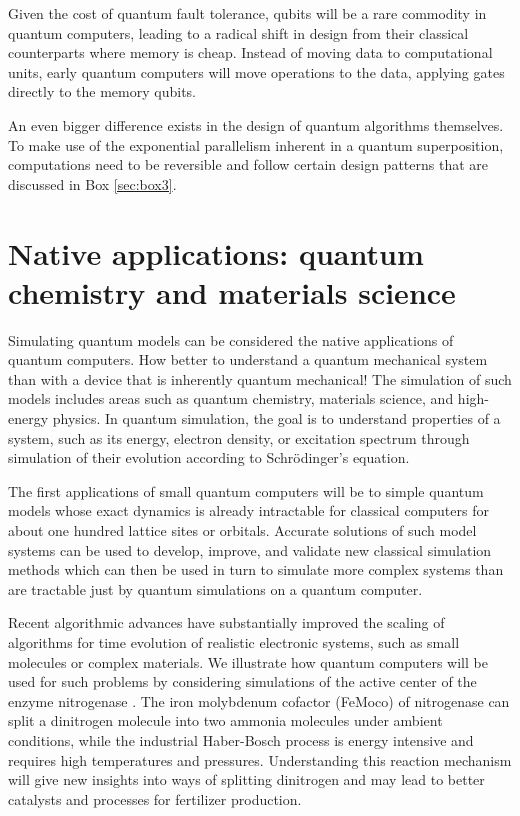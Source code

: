 \documentclass[journal]{IEEEtran}
\begin{document}
Given the cost of quantum fault tolerance, qubits will be a rare commodity in quantum computers, leading to a radical shift in design from their classical counterparts where memory is cheap. Instead of moving data to computational units, early quantum computers will move operations to the data, applying gates directly to the memory qubits.

 An even bigger difference exists in the design of quantum algorithms themselves. To make use of the  exponential parallelism inherent in a quantum superposition, computations need to be reversible and follow certain design patterns that are discussed in Box \ref{sec:box3}. 





\section{Native applications: quantum chemistry and materials science}

Simulating quantum models can be considered the native applications of quantum computers. How better to understand a quantum mechanical system than with a device that is inherently quantum mechanical! The simulation of such models includes areas such as quantum chemistry, materials science, and high-energy physics. In quantum simulation, the goal is to understand properties of a system, such as its energy, electron density, or excitation spectrum through simulation of their evolution according to Schr\"odinger's equation.  

The first applications of small quantum computers will be to simple quantum models whose exact dynamics is already intractable for classical computers for about one hundred lattice sites or orbitals.  Accurate solutions of such model systems can be used to develop, improve, and validate new classical simulation methods which can then be used in turn to simulate more complex systems than are tractable just by quantum simulations on a quantum computer. 

Recent algorithmic advances have substantially improved the scaling of algorithms for time evolution of realistic electronic systems, such as small molecules or complex materials. We illustrate how quantum computers will be used for such problems by considering simulations of the active center of the enzyme nitrogenase \cite{nitrogenasepaper}. The iron molybdenum cofactor (FeMoco) of nitrogenase can split a dinitrogen molecule into two ammonia molecules under ambient conditions, while the industrial Haber-Bosch process  is energy intensive and requires high temperatures and pressures. Understanding this reaction mechanism will give new insights into ways of splitting dinitrogen and may lead to better catalysts and processes for fertilizer production.
\end{document}
